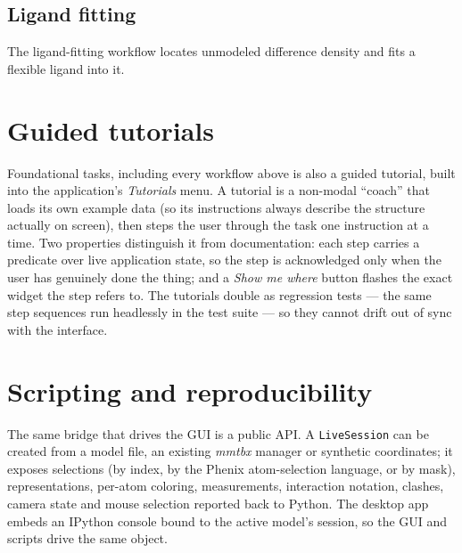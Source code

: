 \documentclass[11pt]{article}
\begin{document}
\subsection{Ligand fitting}

The ligand-fitting workflow locates unmodeled difference density and fits a
flexible ligand into it.

\section{Guided tutorials}

Foundational tasks, including every workflow above is also a guided tutorial, built into the application's
\emph{Tutorials} menu. A tutorial is a non-modal ``coach'' that loads its
own example data (so its instructions always describe the structure actually
on screen), then steps the user through the task one instruction at a time.
Two properties distinguish it from documentation: each step carries a
predicate over live application state, so the step is acknowledged only when
the user has genuinely done the thing; and a \emph{Show me where} button
flashes the exact widget the step refers to. The tutorials double as
regression tests --- the same step sequences run headlessly in the test
suite --- so they cannot drift out of sync with the interface.

\section{Scripting and reproducibility}

The same bridge that drives the GUI is a public API. A
\texttt{LiveSession} can be created from a model file, an existing
\emph{mmtbx} manager or synthetic coordinates; it exposes selections (by
index, by the Phenix atom-selection language, or by mask), representations,
per-atom coloring, measurements, interaction notation, clashes, camera
state and mouse selection reported back to Python. The desktop app embeds an
IPython console bound to the active model's session, so the GUI and scripts
drive the same object.
\end{document}
